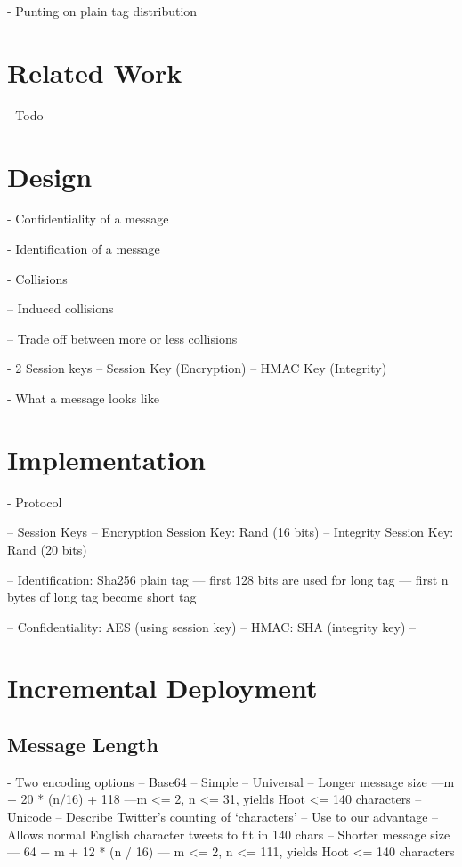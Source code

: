\documentclass{acm_proc_article-sp}
\begin{document}
- Punting on plain tag distribution

\section{Related Work}

- Todo

\section{Design}

- Confidentiality of a message

- Identification of a message

- Collisions

-- Induced collisions

-- Trade off between more or less collisions

- 2 Session keys
-- Session Key (Encryption)
-- HMAC Key (Integrity)

- What a message looks like

\section{Implementation}

- Protocol

-- Session Keys
-- Encryption Session Key: Rand (16 bits)
-- Integrity Session Key: Rand (20 bits)

-- Identification: Sha256 plain tag
--- first 128 bits are used for long tag
--- first n bytes of long tag become short tag

-- Confidentiality: AES (using session key)
-- HMAC: SHA (integrity key)
-- 

\section{Incremental Deployment}

\subsection{Message Length}

- Two encoding options
-- Base64
	-- Simple
	-- Universal
	-- Longer message size 
		---m + 20 * (n/16) + 118 
		---m <= 2, n <= 31, yields Hoot <= 140 characters
-- Unicode
	-- Describe Twitter's counting of `characters'
	-- Use to our advantage
	-- Allows normal English character tweets to fit in 140 chars
	-- Shorter message size
	--- 64 + m + 12 * (n / 16)
	--- m <= 2, n <= 111, yields Hoot <= 140 characters
\end{document}
